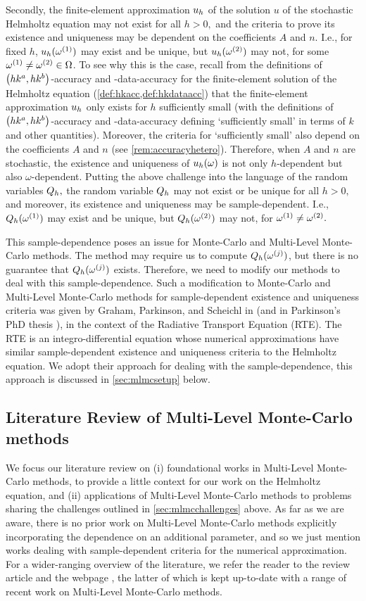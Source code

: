 Secondly, the finite-element approximation $u_{h}$ of the solution $u$ of the stochastic Helmholtz equation may not exist for all $h > 0,$ and the criteria to prove its existence and uniqueness may be dependent on the coefficients $A$ and $n.$ I.e., for fixed $h$, $u_{h}(\omega^{(1)})$ may exist and be unique, but $u_{h}(\omega^{(2)})$ may not, for some $\omega^{(1)}\neq\omega^{(2)}\in\Omega$. To see why this is the case, recall from the definitions of $\hk{a}{b}$-accuracy and -data-accuracy for the finite-element solution of the Helmholtz equation (\cref{def:hkacc,def:hkdataacc}) that the finite-element approximation $u_{h}$ only exists for $h$ sufficiently small (with the definitions of $\hk{a}{b}$-accuracy and -data-accuracy defining `sufficiently small' in terms of $k$ and other quantities). Moreover, the criteria for `sufficiently small' also depend on the coefficients $A$ and $n$ (see \cref{rem:accuracyhetero}). Therefore, when $A$ and $n$ are stochastic, the existence and uniqueness of $u_{h}(\omega)$ is not only $h$-dependent but also $\omega$-dependent. Putting the above challenge into the language of the random variables $Q_{h},$ the random variable $Q_{h}$ may not exist or be unique for all $h>0,$ and moreover, its existence and uniqueness may be sample-dependent. I.e., $Q_{h}(\omega^{(1)})$ may exist and be unique, but $Q_{h}(\omega^{(2)})$ may not, for $\omega^{(1)}\neq\omega^{(2)}.$

This sample-dependence poses an issue for Monte-Carlo and Multi-Level Monte-Carlo methods. The method may require us to compute $Q_{h}(\omega^{(j)})$, but there is no guarantee that $Q_{h}(\omega^{(j)})$ exists. Therefore, we need to modify our methods to deal with this sample-dependence. Such a modification to Monte-Carlo and Multi-Level Monte-Carlo methods for sample-dependent existence and uniqueness criteria was given by Graham, Parkinson, and Scheichl in \cite{GrPaSc:19} (and in Parkinson's PhD thesis \cite{Pa:18}), in the context of the Radiative Transport Equation (RTE). The RTE is an integro-differential equation whose numerical approximations have similar sample-dependent existence and uniqueness criteria to the Helmholtz equation. We adopt their approach for dealing with the sample-dependence, this approach is discussed in \cref{sec:mlmcsetup} below.

\subsection{Literature Review of Multi-Level Monte-Carlo methods}
We focus our literature review on (i) foundational works in Multi-Level Monte-Carlo methods, to provide a little context for our work on the Helmholtz equation, and (ii) applications of Multi-Level Monte-Carlo methods to problems sharing the challenges outlined in \cref{sec:mlmcchallenges} above. As far as we are aware, there is no prior work on Multi-Level Monte-Carlo methods explicitly incorporating the dependence on an additional parameter, and so we just mention works dealing with sample-dependent criteria for the numerical approximation. For a wider-ranging overview of the literature, we refer the reader to the review article \cite{Gi:15} and the webpage \cite{Gi}, the latter of which is kept up-to-date with a range of recent work on Multi-Level Monte-Carlo methods.

